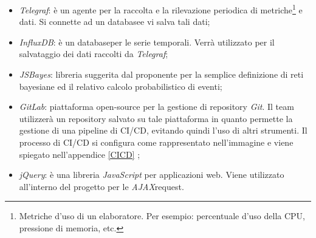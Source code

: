 \begin{itemize} 
	\item \textit{Telegraf}\glossario: è un agente per la raccolta e la rilevazione periodica di metriche\footnote{Metriche d'uso di un elaboratore. Per esempio: percentuale d'uso della CPU, pressione di memoria, etc.} e dati. Si connette ad un database\glossario e vi salva tali dati;
	\item \textit{InfluxDB}\glossario: è un database\glossario per le serie temporali. Verrà utilizzato per il salvataggio dei dati raccolti da \textit{Telegraf};
	\item \textit{JSBayes}\glossario: libreria suggerita dal proponente per la semplice definizione di reti bayesiane ed il relativo calcolo probabilistico di eventi; 
	\item \textit{GitLab}\glossario: piattaforma open-source per la gestione di repository \textit{Git}. Il team utilizzerà un repository salvato su tale piattaforma in quanto permette la gestione di una pipeline di CI/CD\glossario, evitando quindi l'uso di altri strumenti. Il processo di CI/CD si configura come rappresentato nell'immagine e viene spiegato nell'appendice \ref{CICD} ;
	\item \textit{jQuery}\glossario: è una libreria \textit{JavaScript} per applicazioni web. Viene utilizzato all'interno del progetto per le \textit{AJAX}\glossario request.
\end{itemize}

